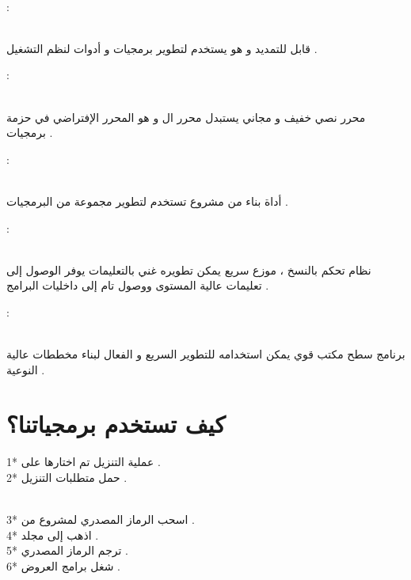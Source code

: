 \documentclass[11pt,a4paper]{report}
\begin{document}
\begin{otherlanguage}{arabic}
\begin{otherlanguage}{arabic}
\begin{center}
\\
\begin{flushleft}
\underline{} :
\end{flushleft}
\\
\textit{} قابل للتمديد و هو يستخدم لتطوير برمجيات \textit{} و أدوات لنظم التشغيل .
\\
\begin{flushleft}
\underline{} :
\end{flushleft}
\\
محرر نصي خفيف و مجاني يستبدل محرر ال \textit{} و هو المحرر الإفتراضي في حزمة برمجيات \textit{} .
\\
\begin{flushleft}
\underline{} :
\end{flushleft}
\\
أداة بناء من مشروع \textit{} تستخدم لتطوير مجموعة من البرمجيات .
\\
\begin{flushleft}
\underline{} :
\end{flushleft}
\\
نظام تحكم بالنسخ  ، موزع سريع يمكن تطويره غني بالتعليمات يوفر الوصول إلى تعليمات عالية المستوى ووصول تام إلى داخليات البرامج .
\\
\begin{flushleft}
\underline{} :
\end{flushleft}
\\
برنامج سطح مكتب قوي يمكن استخدامه للتطوير السريع و الفعال لبناء مخططات عالية النوعية .
\\
\end{center}
\end{otherlanguage}
\chapter{كيف تستخدم برمجياتنا؟ }
\begin{otherlanguage}{arabic}
\begin{center}
1* عملية التنزيل تم اختارها على \textit{} .
\\
2* حمل متطلبات التنزيل  .

\\
3* اسحب الرماز المصدري لمشروع \textit{} من \textit{} .
\\

4* اذهب إلى مجلد \textit{} .
\\
5* ترجم الرماز المصدري . 
\\
6* شغل برامج العروض .
\end{center}
\end{otherlanguage}

\end{otherlanguage}
\end{document}
